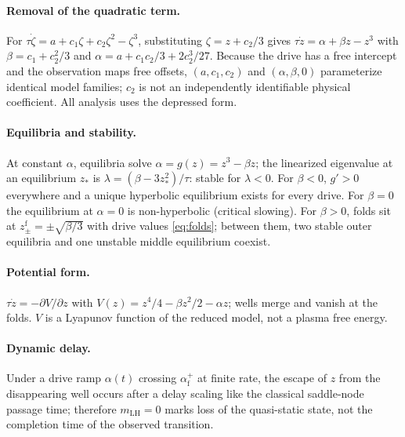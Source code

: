 \documentclass[11pt]{article}
\newcommand{\lat}{z}
\newcommand{\dr}{\alpha}
\newcommand{\mLH}{m_{\mathrm{LH}}}
\begin{document}
\paragraph{Removal of the quadratic term.} For
$\tau\dot\zeta = a + c_1\zeta + c_2\zeta^2 - \zeta^3$, substituting
$\zeta = \lat + c_2/3$ gives
$\tau\dot\lat = \alpha + \beta\lat - \lat^3$ with
$\beta = c_1 + c_2^2/3$ and
$\alpha = a + c_1 c_2/3 + 2c_2^3/27$. Because the drive has a free
intercept and the observation maps free offsets, $(a, c_1, c_2)$ and
$(\alpha, \beta, 0)$ parameterize identical model families; $c_2$ is not
an independently identifiable physical coefficient. All analysis uses the
depressed form.

\paragraph{Equilibria and stability.} At constant $\dr$, equilibria solve
$\dr = g(\lat) = \lat^3 - \beta\lat$; the linearized eigenvalue at an
equilibrium $\lat_*$ is $\lambda = (\beta - 3\lat_*^2)/\tau$: stable for
$\lambda < 0$. For $\beta < 0$, $g' > 0$ everywhere and a unique
hyperbolic equilibrium exists for every drive. For $\beta = 0$ the
equilibrium at $\dr = 0$ is non-hyperbolic (critical slowing). For
$\beta > 0$, folds sit at $\lat^{\mathrm{f}}_{\pm} = \pm\sqrt{\beta/3}$
with drive values \eqref{eq:folds}; between them, two stable outer
equilibria and one unstable middle equilibrium coexist.

\paragraph{Potential form.} $\tau\dot\lat = -\partial V/\partial\lat$ with
$V(\lat) = \lat^4/4 - \beta\lat^2/2 - \dr\lat$; wells merge and vanish at
the folds. $V$ is a Lyapunov function of the reduced model, not a plasma
free energy.

\paragraph{Dynamic delay.} Under a drive ramp $\dr(t)$ crossing
$\dr_{\mathrm{f}}^{+}$ at finite rate, the escape of $\lat$ from the
disappearing well occurs after a delay scaling like the classical
saddle-node passage time; therefore $\mLH = 0$ marks loss of the
quasi-static state, not the completion time of the observed transition.




\end{document}

